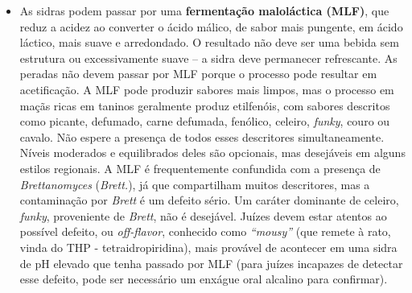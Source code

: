 \begin{itemize}
\item As sidras podem passar por uma \textbf{fermentação maloláctica (MLF)}, que reduz a acidez ao converter o ácido málico, de sabor mais pungente, em ácido láctico, mais suave e arredondado. O resultado não deve ser uma bebida sem estrutura ou excessivamente suave – a sidra deve permanecer refrescante. As peradas não devem passar por MLF porque o processo pode resultar em acetificação. A MLF pode produzir sabores mais limpos, mas o processo em maçãs ricas em taninos geralmente produz etilfenóis, com sabores descritos como picante, defumado, carne defumada, fenólico, celeiro, \textit{funky}, couro ou cavalo. Não espere a presença de todos esses descritores simultaneamente. Níveis moderados e equilibrados deles são opcionais, mas desejáveis em alguns estilos regionais. A MLF é frequentemente confundida com a presença de \textit{Brettanomyces} (\textit{Brett.}), já que compartilham muitos descritores, mas a contaminação por \textit{Brett} é um defeito sério. Um caráter dominante de celeiro, \textit{funky}, proveniente de \textit{Brett}, não é desejável. Juízes devem estar atentos ao possível defeito, ou \textit{off-flavor}, conhecido como \textit{“mousy”} (que remete à rato, vinda do THP - tetraidropiridina), mais provável de acontecer em uma sidra de pH elevado que tenha passado por MLF (para juízes incapazes de detectar esse defeito, pode ser necessário um enxágue oral alcalino para confirmar).
\end{itemize}
